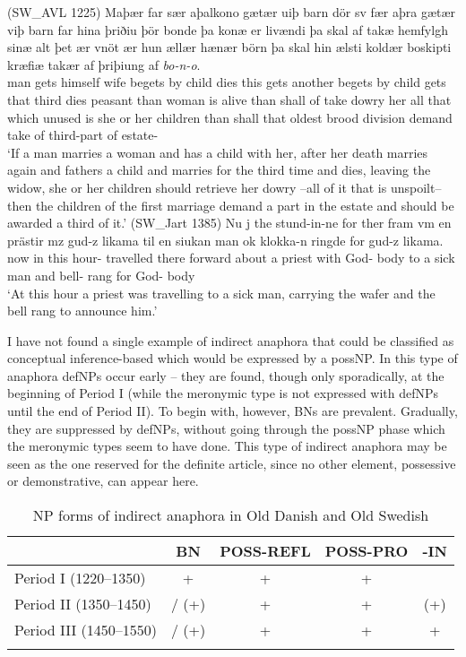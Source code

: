 \documentclass[output=paper]{langsci/langscibook}
\begin{document}
\begin{exe}
\ex\label{6ex:33}
(SW\_AVL 1225)
\exi{}
\gll Maþær far sær aþalkono gætær uiþ barn dör sv fær aþra gætær viþ barn far hina þriðiu þör bonde þa konæ er livændi þa skal af takæ hemfylgh sinæ alt þet ær vnöt ær hun ællær hænær börn þa skal hin ælsti koldær boskipti kræfiæ takær af þriþiung af {\emph{bo-n-o}}. \\
man gets himself wife begets by child dies this gets another begets by child gets that third dies peasant than woman is alive than shall of take dowry her all that which unused is she or her children than shall that oldest brood division demand take of third-part of estate-{} \\
\glt `If a man marries a woman and has a child with her, after her death marries again and fathers a child and marries for the third time and dies, leaving the widow, she or her children should retrieve her dowry --all of it that is unspoilt-- then the children of the first marriage demand a part in the estate and should be awarded a third of it.'
\ex\label{6ex:34}
(SW\_Jart 1385)
\exi{}
\gll Nu j the stund-in-ne for ther fram vm en prästir mz gud-z likama til en siukan man ok klokka-n ringde for gud-z likama. \\
now in this hour-{} travelled there forward about a priest with God-{} body to a sick man and bell-{} rang for God-{} body \\
\glt `At this hour a priest was travelling to a sick man, carrying the wafer and the bell rang to announce him.'
\end{exe}

I have not found a single example of indirect anaphora that could be classified as conceptual inference-based which would be expressed by a possNP. In this type of anaphora defNPs occur early -- they are found, though only sporadically, at the beginning of Period I (while the meronymic type is not expressed with defNPs until the end of Period II). To begin with, however, BNs are prevalent. Gradually, they are suppressed by defNPs, without going through the possNP phase which the meronymic types seem to have done. This type of indirect anaphora may be seen as the one reserved for the definite article, since no other element, possessive or demonstrative, can appear here. 

\begin{table}[H]
\centering
\begin{tabular}{lcccc}
\lsptoprule
					& {\bf{BN}}	& {\bf{POSS-REFL}}	& {\bf{POSS-PRO}}	& {\bf{-IN}} \\ 
\midrule
Period I (1220–1350)	& +			& +				& +				& \minus \\ 
Period II (1350–1450)	& \minus / (+)	& +				& +				& (+) \\ 
Period III (1450–1550)	& \minus / (+)	& +				& +				& + \\ 
\lspbottomrule
\end{tabular}
\caption{NP forms of indirect anaphora in Old Danish and Old Swedish}\label{6table:4}
\end{table}
\end{document}
